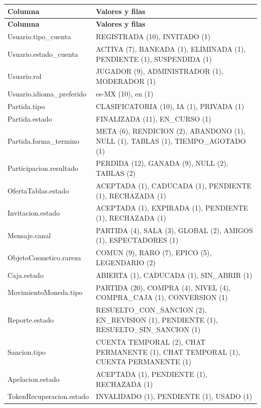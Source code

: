 \begin{center}\footnotesize\setlength{\tabcolsep}{2pt}
\begin{longtable}{|L{161.2pt}|L{301.0pt}|}
\hline
\textbf{\hspace{0pt}Columna} & \textbf{\hspace{0pt}Valores y filas} \\ \hline
\endfirsthead
\hline
\textbf{\hspace{0pt}Columna} & \textbf{\hspace{0pt}Valores y filas} \\ \hline
\endhead
Usuario.tipo\_\allowbreak{}cuenta & REGISTRADA (10), INVITADO (1) \\ \hline
Usuario.estado\_\allowbreak{}cuenta & ACTIVA (7), BANEADA (1), ELIMINADA (1), PENDIENTE (1), SUSPENDIDA (1) \\ \hline
Usuario.rol & JUGADOR (9), ADMINISTRADOR (1), MODERADOR (1) \\ \hline
Usuario.idioma\_\allowbreak{}preferido & es-MX (10), en (1) \\ \hline
Partida.tipo & CLASIFICATORIA (10), IA (1), PRIVADA (1) \\ \hline
Partida.estado & FINALIZADA (11), EN\_\allowbreak{}CURSO (1) \\ \hline
Partida.forma\_\allowbreak{}termino & META (6), RENDICION (2), ABANDONO (1), NULL (1), TABLAS (1), TIEMPO\_\allowbreak{}AGOTADO (1) \\ \hline
Participacion.resultado & PERDIDA (12), GANADA (9), NULL (2), TABLAS (2) \\ \hline
OfertaTablas.estado & ACEPTADA (1), CADUCADA (1), PENDIENTE (1), RECHAZADA (1) \\ \hline
Invitacion.estado & ACEPTADA (1), EXPIRADA (1), PENDIENTE (1), RECHAZADA (1) \\ \hline
Mensaje.canal & PARTIDA (4), SALA (3), GLOBAL (2), AMIGOS (1), ESPECTADORES (1) \\ \hline
ObjetoCosmetico.rareza & COMUN (9), RARO (7), EPICO (5), LEGENDARIO (2) \\ \hline
Caja.estado & ABIERTA (1), CADUCADA (1), SIN\_\allowbreak{}ABRIR (1) \\ \hline
MovimientoMoneda.tipo & PARTIDA (20), COMPRA (4), NIVEL (4), COMPRA\_\allowbreak{}CAJA (1), CONVERSION (1) \\ \hline
Reporte.estado & RESUELTO\_\allowbreak{}CON\_\allowbreak{}SANCION (2), EN\_\allowbreak{}REVISION (1), PENDIENTE (1), RESUELTO\_\allowbreak{}SIN\_\allowbreak{}SANCION (1) \\ \hline
Sancion.tipo & CUENTA TEMPORAL (2), CHAT PERMANENTE (1), CHAT TEMPORAL (1), CUENTA PERMANENTE (1) \\ \hline
Apelacion.estado & ACEPTADA (1), PENDIENTE (1), RECHAZADA (1) \\ \hline
TokenRecuperacion.estado & INVALIDADO (1), PENDIENTE (1), USADO (1) \\ \hline
\end{longtable}
\end{center}
